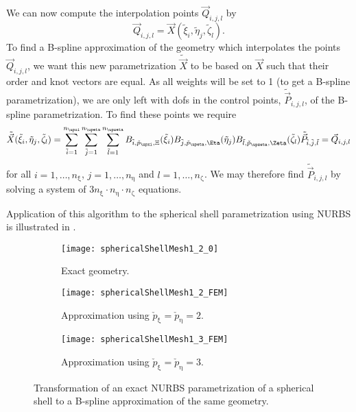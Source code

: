 We can now compute the interpolation points $\vec{Q}_{i,j,l}$ by
\begin{equation}
	\vec{Q}_{i,j,l} = \vec{X}(\tilde{\xi}_i,\tilde{\eta}_j,\tilde{\zeta}_l).
\end{equation}
To find a B-spline approximation of the geometry which interpolates the points $\vec{Q}_{i,j,l}$, we want this new parametrization $\tilde{\vec{X}}$ to be based on $\vec{X}$ such that their order and knot vectors are equal. As all weights will be set to 1 (to get a B-spline parametrization), we are only left with dofs in the control points, $\tilde{\vec{P}}_{i,j,l}$, of the B-spline parametrization. To find these points we require
\begin{equation}
	\tilde{\vec{X}}(\tilde{\xi}_i,\tilde{\eta}_j,\tilde{\zeta}_l) = \sum_{\tilde{i}=1}^{n_\upxi}\sum_{\tilde{j}=1}^{n_\upeta}\sum_{\tilde{l}=1}^{n_\upzeta} B_{\tilde{i},\check{p}_\upxi,\Xi}(\tilde{\xi}_i)B_{\tilde{j},\check{p}_\upeta,\Eta}(\tilde{\eta}_j)B_{\tilde{l},\check{p}_\upzeta,\Zeta}(\tilde{\zeta}_l)\tilde{\vec{P}}_{\tilde{i},\tilde{j},\tilde{l}} = \vec{Q}_{i,j,l}
\end{equation}
for all $i=1,\dots,n_\upxi$, $j=1,\dots,n_\upeta$ and $l=1,\dots,n_\upzeta$. We may therefore find $\tilde{\vec{P}}_{i,j,l}$ by solving a system of $3n_\upxi\cdot n_\upeta\cdot n_\upzeta$ equations.

Application of this algorithm to the spherical shell parametrization using NURBS is illustrated in .
\begin{figure}
	\centering        
	\begin{subfigure}[t]{0.26\textwidth}
		\centering
		\texttt{[image: sphericalShellMesh1\_2\_0]}
		\caption{Exact geometry.}
	\end{subfigure}%
	\hspace*{0.11\textwidth}%
	\begin{subfigure}[t]{0.26\textwidth}
		\centering
		\texttt{[image: sphericalShellMesh1\_2\_FEM]}
		\caption{Approximation using $\check{p}_\upxi=\check{p}_\upeta=2$.}
	\end{subfigure}%
	\hspace*{0.11\textwidth}%
	\begin{subfigure}[t]{0.26\textwidth}
		\centering
		\texttt{[image: sphericalShellMesh1\_3\_FEM]}
		\caption{Approximation using $\check{p}_\upxi=\check{p}_\upeta=3$.}
	\end{subfigure}
	\caption{Transformation of an exact NURBS parametrization of a spherical shell to a B-spline approximation of the same geometry.}
	\label{Fig2:NURBStoBsplineTransVis}
\end{figure}
